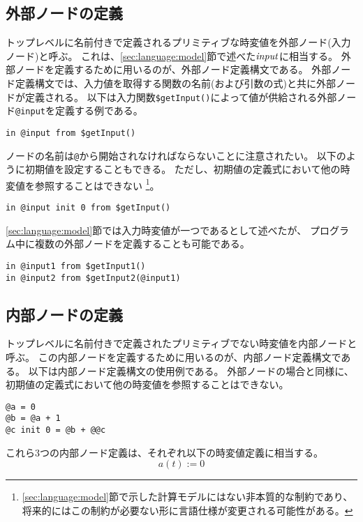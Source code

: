 \subsection{外部ノードの定義}
トップレベルに名前付きで定義されるプリミティブな時変値を外部ノード(入力ノード)と呼ぶ。
これは、\ref{sec:language:model}節で述べた${\it input}$に相当する。
外部ノードを定義するために用いるのが、外部ノード定義構文である。
外部ノード定義構文では、入力値を取得する関数の名前(および引数の式)と共に外部ノードが定義される。
以下は入力関数\texttt{\$getInput()}によって値が供給される外部ノード\texttt{@input}を定義する例である。
\begin{lstlisting}[basicstyle=\ttfamily\small,language=SFRP]
in @input from $getInput()
\end{lstlisting}
ノードの名前は\texttt{@}から開始されなければならないことに注意されたい。
以下のように初期値を設定することもできる。
ただし、初期値の定義式において他の時変値を参照することはできない
\footnote[1]{
\ref{sec:language:model}節で示した計算モデルにはない非本質的な制約であり、
将来的にはこの制約が必要ない形に言語仕様が変更される可能性がある。
}。
\begin{lstlisting}[basicstyle=\ttfamily\small,language=SFRP]
in @input init 0 from $getInput()
\end{lstlisting}
\ref{sec:language:model}節では入力時変値が一つであるとして述べたが、
プログラム中に複数の外部ノードを定義することも可能である。
\begin{lstlisting}[basicstyle=\ttfamily\small,language=SFRP]
in @input1 from $getInput1()
in @input2 from $getInput2(@input1)
\end{lstlisting}

\subsection{内部ノードの定義}
トップレベルに名前付きで定義されたプリミティブでない時変値を内部ノードと呼ぶ。
この内部ノードを定義するために用いるのが、内部ノード定義構文である。
以下は内部ノード定義構文の使用例である。
外部ノードの場合と同様に、初期値の定義式において他の時変値を参照することはできない。
\begin{lstlisting}[basicstyle=\ttfamily\small,language=SFRP]
@a = 0
@b = @a + 1
@c init 0 = @b + @@c
\end{lstlisting}
これら3つの内部ノード定義は、それぞれ以下の時変値定義に相当する。
\begin{equation*}
  a(t) := 0
\end{equation*}


